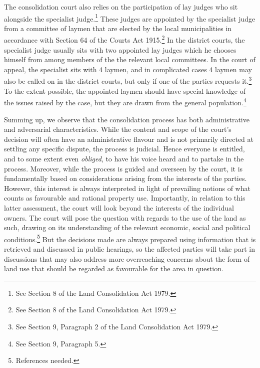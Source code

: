 The consolidation court also relies on the participation of lay judges who sit alongside the specialist judge.\footnote{See Section 8 of the Land Consolidation Act 1979.} These judges are appointed by the specialist judge from a committee of laymen that are elected by the local municipalities in accordance with Section 64 of the Courts Act 1915.\footnote{See Section 8 of the Land Consolidation Act 1979.} In the district courts, the specialist judge usually sits with two appointed lay judges which he chooses himself from among members of the the relevant local committees. In the court of appeal, the specialist sits with 4 laymen, and in complicated cases 4 laymen may also be called on in the district courts, but only if one of the parties requests it.\footnote{See Section 9, Paragraph 2 of the Land Consolidation Act 1979.} To the extent possible, the appointed laymen should have special knowledge of the issues raised by the case, but they are drawn from the general population.\footnote{See Section 9, Paragraph 5.}

Summing up, we observe that the consolidation process has both administrative and adversarial characteristics. While the content and scope of the court's decision will often have an administrative flavour and is not primarily directed at settling any specific dispute, the process is judicial. Hence everyone is entitled, and to some extent even \emph{obliged}, to have his voice heard and to partake in the process. Moreover, while the process is guided and overseen by the court, it is fundamentally based on considerations arising from the interests of the parties. However, this interest is always interpreted in light of prevailing notions of what counts as favourable and rational property use. Importantly, in relation to this latter assessment, the court will look beyond the interests of the individual owners. The court will pose the question with regards to the use of the land as such, drawing on its understanding of the relevant economic, social and political conditions.\footnote{References needed.} But the decisions made are always prepared using information that is retrieved and discussed in public hearings, so the affected parties will take part in discussions that may also address more overreaching concerns about the form of land use that should be regarded as favourable for the area in question.

